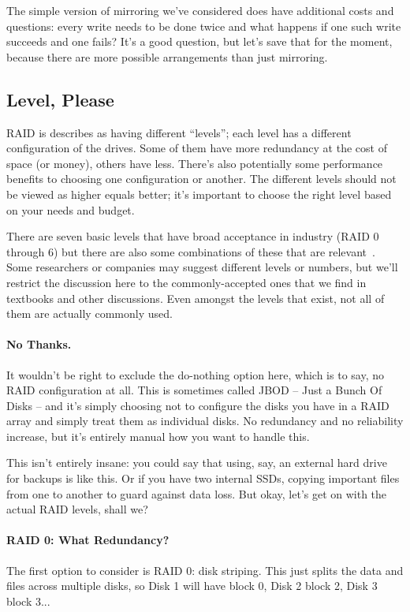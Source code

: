 The simple version of mirroring we've considered does have additional costs and questions: every write needs to be done twice and what happens if one such write succeeds and one fails? It's a good question, but let's save that for the moment, because there are more possible arrangements than just mirroring.

\subsection*{Level, Please}

RAID is describes as having different ``levels''; each level has a different configuration of the drives. Some of them have more redundancy at the cost of space (or money), others have less. There's also potentially some performance benefits to choosing one configuration or another. The different levels should not be viewed as higher equals better; it's important to choose the right level based on your needs and budget. 

There are seven basic levels that have broad acceptance in industry (RAID 0 through 6) but there are also some combinations of these that are relevant~\cite{osi}. Some researchers or companies may suggest different levels or numbers, but we'll restrict the discussion here to the commonly-accepted ones that we find in textbooks and other discussions. Even amongst the levels that exist, not all of them are actually commonly used. 

\paragraph{No Thanks.} It wouldn't be right to exclude the do-nothing option here, which is to say, no RAID configuration at all. This is sometimes called JBOD -- Just a Bunch Of Disks -- and it's simply choosing not to configure the disks you have in a RAID array and simply treat them as individual disks. No redundancy and no reliability increase, but it's entirely manual how you want to handle this.

This isn't entirely insane: you could say that using, say, an external hard drive for backups is like this. Or if you have two internal SSDs, copying important files from one to another to guard against data loss. But okay, let's get on with the actual RAID levels, shall we?

\paragraph{RAID 0: What Redundancy?}
The first option to consider is RAID 0: disk striping. This just splits the data and files across multiple disks, so Disk 1 will have block 0, Disk 2 block 2, Disk 3 block 3... 

